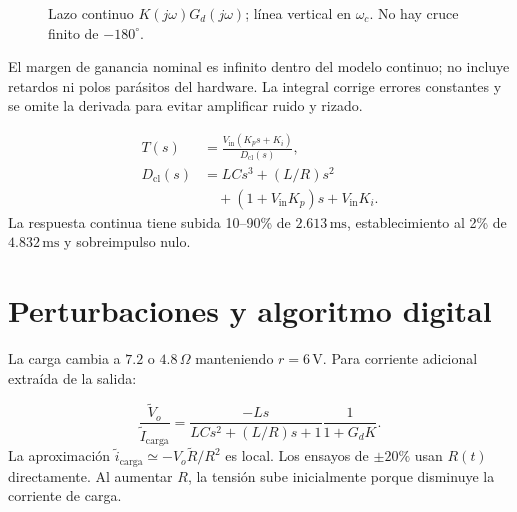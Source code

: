 \documentclass[conference,letterpaper]{IEEEtran}
\begin{document}
\begin{figure}[H]\centering{}\caption{Lazo continuo $K(j\omega)G_d(j\omega)$; línea vertical en $\omega_c$. No hay cruce finito de $-180^\circ$.}\label{fig:bode}\end{figure}
El margen de ganancia nominal es infinito dentro del modelo continuo; no incluye retardos ni polos parásitos del hardware. La integral corrige errores constantes y se omite la derivada para evitar amplificar ruido y rizado.

\begin{equation}\label{eq:closed}\begin{aligned}T(s)&=\frac{V_{\mathrm{in}}(K_ps+K_i)}{D_{\mathrm{cl}}(s)},\\D_{\mathrm{cl}}(s)&=LCs^3+(L/R)s^2\\&\quad+(1+V_{\mathrm{in}}K_p)s+V_{\mathrm{in}}K_i.\end{aligned}\end{equation}
La respuesta continua tiene subida 10--90\% de $2.613\,\mathrm{ms}$, establecimiento al 2\% de $4.832\,\mathrm{ms}$ y sobreimpulso nulo.

\section{Perturbaciones y algoritmo digital}
La carga cambia a $7.2$ o $4.8\,\Omega$ manteniendo $r=6\,\mathrm{V}$. Para corriente adicional extraída de la salida:

\begin{equation}\label{eq:disturbance}\frac{\widetilde V_o}{\widetilde I_{\mathrm{carga}}}=\frac{-Ls}{LCs^2+(L/R)s+1}\frac1{1+G_dK}.\end{equation}
La aproximación $\tilde i_{\mathrm{carga}}\simeq-V_o\tilde R/R^2$ es local. Los ensayos de $\pm20\%$ usan $R(t)$ directamente. Al aumentar $R$, la tensión sube inicialmente porque disminuye la corriente de carga.
\end{document}
